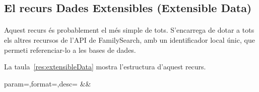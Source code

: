 \subsection{El recurs Dades Extensibles (Extensible Data)}

    \paragraph{}
    Aquest recurs és probablement el més simple de tots. S'encarrega de dotar a tots els altres recursos de l'API de FamilySearch, amb un identificador local únic, que permeti referenciar-lo a les bases de dades.

    La taula~\ref{res:extensibleData} mostra l'estructura d'aquest recurs.

    \begin{center}
             {param=\param,format=\format,desc=\desc}
             {\param&\format&\desc}
     \end{center}
